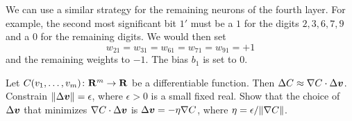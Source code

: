 \begin{solution}
We can use a similar strategy for the remaining neurons of the fourth layer. For 
example, the second most significant bit $1'$ must be a $1$ for the digits 
$2, 3, 6, 7, 9$ and a $0$ for the remaining digits. We would then set 
\[ 
w_{2 1} = w_{3 1} = w_{6 1} = w_{7 1} = w_{9 1} = +1 
\]
and the remaining weights to $-1$. The bias $b_1$ is set to $0$. 
\end{solution}

\begin{exercise}
Let $C(v_1, \ldots, v_m) \colon \mathbf{R}^m \rightarrow \mathbf{R}$ be a differentiable 
function. Then $\Delta C \approx \nabla C \cdot \Delta \boldsymbol{v}$. Constrain
$\lVert\Delta \boldsymbol{v}\rVert = \epsilon$, where $\epsilon > 0$ is a small fixed 
real. Show that the choice of $\Delta \boldsymbol{v}$ that minimizes 
$\nabla C \cdot \Delta \boldsymbol{v}$ is $\Delta \boldsymbol{v} = - \eta \nabla C$, 
where $\eta = \epsilon / \lVert\nabla C\rVert$.
\end{exercise}
\begin{solution}

\end{solution}
